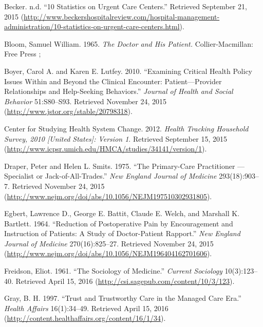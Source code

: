 \documentclass[12pt,twoside]{reedthesis}
\begin{document}
  \hypertarget{ref-UCux5f10STATS}{}
  Becker. n.d. ``10 Statistics on Urgent Care Centers.'' Retrieved
  September 21, 2015
  (\url{http://www.beckershospitalreview.com/hospital-management-administration/10-statistics-on-urgent-care-centers.html}).
  
  \hypertarget{ref-bloomux5fdoctorux5f1965}{}
  Bloom, Samuel William. 1965. \emph{The Doctor and His Patient.}
  Collier-Macmillan: Free Press ;
  
  \hypertarget{ref-boyerux5fexaminingux5f2010}{}
  Boyer, Carol A. and Karen E. Lutfey. 2010. ``Examining Critical Health
  Policy Issues Within and Beyond the Clinical Encounter:
  Patient---Provider Relationships and Help-Seeking Behaviors.''
  \emph{Journal of Health and Social Behavior} 51:S80--S93. Retrieved
  November 24, 2015 (\url{http://www.jstor.org/stable/20798318}).
  
  \hypertarget{ref-HEALTHux5fTRACKINGux5f2012}{}
  Center for Studying Health System Change. 2012. \emph{Health Tracking
  Household Survey, 2010 {[}United States{]}: Version 1}. Retrieved
  September 15, 2015
  (\url{http://www.icpsr.umich.edu/HMCA/studies/34141/version/1}).
  
  \hypertarget{ref-draperux5fprimary-careux5f1975}{}
  Draper, Peter and Helen L. Smits. 1975. ``The Primary-Care Practitioner
  --- Specialist or Jack-of-All-Trades.'' \emph{New England Journal of
  Medicine} 293(18):903--7. Retrieved November 24, 2015
  (\url{http://www.nejm.org/doi/abs/10.1056/NEJM197510302931805}).
  
  \hypertarget{ref-egbertux5freductionux5f1964}{}
  Egbert, Lawrence D., George E. Battit, Claude E. Welch, and Marshall K.
  Bartlett. 1964. ``Reduction of Postoperative Pain by Encouragement and
  Instruction of Patients: A Study of Doctor-Patient Rapport.'' \emph{New
  England Journal of Medicine} 270(16):825--27. Retrieved November 24,
  2015 (\url{http://www.nejm.org/doi/abs/10.1056/NEJM196404162701606}).
  
  \hypertarget{ref-freidsonux5fsociologyux5f1961}{}
  Freidson, Eliot. 1961. ``The Sociology of Medicine.'' \emph{Current
  Sociology} 10(3):123--40. Retrieved April 15, 2016
  (\url{http://csi.sagepub.com/content/10/3/123}).
  
  \hypertarget{ref-grayux5ftrustux5f1997}{}
  Gray, B. H. 1997. ``Trust and Trustworthy Care in the Managed Care
  Era.'' \emph{Health Affairs} 16(1):34--49. Retrieved April 15, 2016
  (\url{http://content.healthaffairs.org/content/16/1/34}).
  
\end{document}
